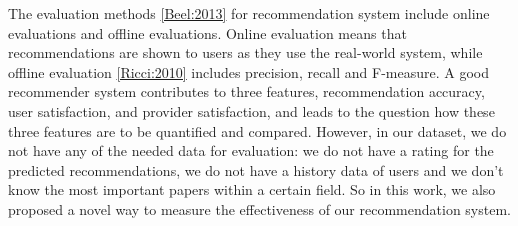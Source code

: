 The evaluation methods \ref{Beel:2013} for recommendation system include online evaluations and offline evaluations. Online evaluation means that recommendations are shown to users as they use the real-world system, while offline evaluation \ref{Ricci:2010} includes precision, recall and F-measure. A good recommender system contributes to three features, recommendation accuracy, user satisfaction, and provider satisfaction, and leads to the question how these three features are to be quantified and compared. However, in our dataset, we do not have any of the needed data for evaluation: we do not have a rating for the predicted recommendations, we do not have a history data of users and we don't know the most important papers within a certain field. So in this work, we also proposed a novel way to measure the effectiveness of our recommendation system.

